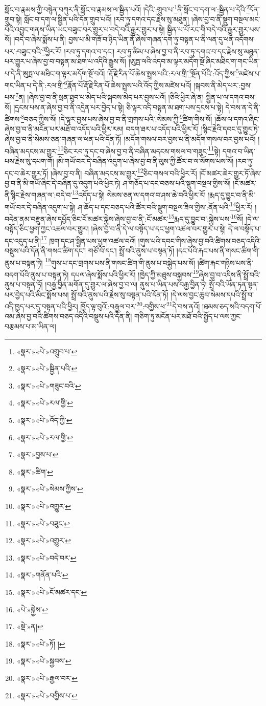 སློང་བ་རྣམས་ཀྱི་བསྙེན་བཀུར་ནི་སློང་བ་རྣམས་ལ་སྦྱིན་པའོ། །དེའི་:གྲུབ་པ་\footnote{«སྣར་»«པེ་»འགྲུབ་པ་}ནི་སློང་བ་དག་ལ་:སྦྱིན་པ་དེའི་\footnote{«སྣར་»«པེ་»སྦྱིན་པའི་}དོན་གྲུབ་སྟེ། སློང་བ་དག་ལ་སྦྱིན་པའི་དོན་གྲུབ་པའོ། །རབ་ཏུ་དགའ་དང་རྗེས་སུ་མཐུན། །ཞེས་བྱ་བ་ནི་སྡུག་བསྔལ་མང་པོའི་འབྱུང་གནས་ཡིན་ཡང་བཟུང་བར་གྱུར་པ་བདེ་བའི་རྒྱུར་གྱུར་པ་སྟེ། སྦྱིན་པ་པོ་རང་གི་བདེ་བའི་རྒྱུར་གྱུར་པས་སོ། །བདེ་བ་ཞེས་སྨོས་པ་ནི། བྱས་པ་མི་གཟོ་བ་ཉིད་ཡིན་ནོ་ཞེས་གཞན་དག་ཏུ་བསྟན་པ་ནི་ལན་དུ་ཕན་འདོགས་པར་:བཟུང་བའི་\footnote{«སྣར་»«པེ་»གཟུང་བའི་}ཕྱིར་རོ། །རབ་ཏུ་དགའ་བ་དང་། རབ་ཏུ་ཚིམ་པ་ཞེས་བྱ་བ་ནི་རབ་ཏུ་དགའ་བ་དང་རྗེས་སུ་མཐུན་པར་གྱུར་པ་ཞེས་བྱ་བ་བསྟན་མ་ཐག་པ་འདིའི་རྒྱུས་སོ། །ཨུཏྤ་ལའི་འདབ་མ་ལྟར་མདོག་སྔོ་ཞིང་མཐིང་ག་གང་ཡིན་པ་དེ་ནི་ཨུཏྤ་ལ་མཐིང་ག་ལྟར་མདོག་སྔོ་བའོ། །རྡོ་རྗེ་རིན་པོ་ཆེས་སྤྲས་པའི་:རལ་གྲི་\footnote{«སྣར་»«པེ་»རལ་གྱི་}སྔོན་པོའི་:འོད་ཀྱིས་\footnote{«སྣར་»«པེ་»འོད་ཀྱི་}མཛེས་པ་གང་ཡིན་པ་དེ་ནི་:རལ་གྲི་\footnote{«སྣར་»«པེ་»རལ་གྱི་}རྣོན་པོ་རྡོ་རྗེ་རིན་པོ་ཆེས་སྤྲས་པའི་འོད་ཀྱིས་མཛེས་པའོ། །སྐབས་ནི་མེད་པར་:བྱས་པས་\footnote{«སྣར་»བྱས་པ་}ན། །ཞེས་བྱ་བ་ནི་སྲན་ཐུབ་པ་མེད་པའི་སྐབས་མེད་པར་བྱས་པའོ། །ཅིའི་ཕྱིར་ཞེ་ན། སྦྱིན་པ་ལ་དགའ་བས་སོ། །དྲངས་པས་ན་ཞེས་བྱ་བ་ནི་འདྲེན་པར་བྱེད་པ་སྟེ། ཅི་ལྟར་འདི་བསྟན་མ་ཐག་པས་དྲངས་པ་སྟེ། དེ་བས་ན་དེ་ནི་ཚིགས་\footnote{«སྣར་»ཚིག་}བཅད་ཀྱིས་སོ། །དེ་ལྟར་བྱས་པས་ཞེས་བྱ་བ་ནི་གྲགས་པའི་:སེམས་ཀྱི་\footnote{«སྣར་»«པེ་»སེམས་ཀྱིས་}ཚིག་གིས་སོ། །ཆོས་ལ་དགའ་ཞིང་ཞེས་བྱ་བ་ནི་མངོན་པར་མཐོ་བ་འདོད་པའི་ཕྱིར་རམ། བདག་ཐར་པ་འདོད་པའི་ཕྱིར་རོ། །སྙིང་རྗེའི་དབང་དུ་གྱུར་ཏེ་ཞེས་བྱ་བ་ནི་སེམས་ཅན་གཞན་ལ་ཕན་པའི་དོན་ཏོ། །མདོག་གསལ་བར་བྱས་པ་ནི་མདོག་གསལ་བར་བྱས་པའོ། །བཞིན་མདངས་མ་གྱུར་\footnote{«སྣར་»«པེ་»འགྱུར་}ཅིང་རབ་ཏུ་དང་བ་ཞེས་བྱ་བ་ནི་བཞིན་མདངས་གསལ་བ་གཟུང་\footnote{«སྣར་»«པེ་»བཟུང་}སྟེ། དགའ་བ་ཡིན་པས་རྗེས་སུ་དཔག་གོ། །མི་གཡོ་བར་དེ་བཞིན་འདུག་པ་ཞེས་བྱ་བ་ནི་ལུས་ཀྱི་ཚོར་བ་ལ་སོགས་པས་སོ། །རབ་ཏུ་དང་བ་ཆེར་གྱུར་ཏོ། །ཞེས་བྱ་བ་ནི། བཞིན་མདངས་མ་གྱུར་\footnote{«སྣར་»«པེ་»འགྱུར་}ཅིང་གསལ་བའི་ཕྱིར་རོ། །ངོ་མཚར་ཆེར་གྱུར་ཏོ་ཞེས་བྱ་བ་ནི་མི་གཡོ་ཞིང་དེ་བཞིན་དུ་འདུག་པའི་ཕྱིར་ཏེ། ཤ་གཅོད་པ་དང་བཅས་པའི་སྡུག་བསྔལ་གྱིས་སོ། །ངོ་མཚར་ནི་སྙིང་རྗེས་གཞན་ལ་:བདེ་བ་\footnote{«སྣར་»«པེ་»བདེ་བར་}འདོད་པ་སྟེ། སེམས་ཅན་ལ་དགའ་བ་ཤས་ཆེ་བའི་ཕྱིར་རོ། །རྨད་དུ་བྱུང་བ་ནི་མི་གཡོ་བར་དེ་བཞིན་འདུག་པ་སྟེ། ཤ་ཆོད་པ་དང་བཅད་པའི་ཚོར་བའི་སྡུག་བསྔལ་ཟིལ་གྱིས་:ནོན་པའི་\footnote{«སྣར་»གནོན་པའི་}ཕྱིར་རོ། །བདེན་ནམ་བརྫུན་ཞེས་དཔྱོད་ཅིང་ངོ་མཚར་སྐྱེས་ཞེས་བྱ་བ་ནི་:ངོ་མཚར་\footnote{«སྣར་»«པེ་»ངོ་མཚར་དང་}རྨད་དུ་བྱུང་བ་:སྐྱེས་པས་\footnote{«པེ་»སྐྱེས་}སོ། །དེ་ལ་བསྟོད་ཅིང་ཕྱག་ཀྱང་འཚལ་བར་གྱུར། །ཞེས་བྱ་བ་ནི་དེ་ལ་བསྟོད་པ་དང་ཕྱག་འཚལ་བར་གྱུར་པ་སྟེ། དེ་ལ་བསྟོད་པ་དང་འདུད་པ་ནི།\footnote{«སྡེ་»ན།} ཁྲག་དང་ཤ་སྦྱིན་པས་ཕྱག་འཚལ་བའོ། །གུས་པའི་དབང་གིས་ཞེས་བྱ་བའི་ཚིགས་བཅད་འདིའི་བསྡུས་པའི་དོན་ནི་གསང་ཚིག་དང་། གཙོ་བོ་དང་། སྤྲོ་བའི་ནུས་པ་བསྟན་ཏོ། །དང་པོའི་རྐང་པས་ནི་གསང་ཚིག་གི་ནུས་པ་བསྟན་ཏེ། \footnote{«སྣར་»«པེ་»ཏོ། ། }གུས་པ་དང་གྲགས་པས་ནི་གསང་ཚིག་གི་ནུས་པ་བསྐྱེད་པས་སོ། །ཚིག་རྐང་གཉིས་པས་ནི་བདག་པོའི་ནུས་པ་བསྟན་ཏེ། དཔལ་ཞེས་སྨོས་པའི་ཕྱིར་རོ། །ཁྱེད་ཀྱི་མཐུས་བསྐྱབས་\footnote{«སྣར་»«པེ་»སྐྱབས་}ཞེས་བྱ་བ་འདིས་ནི་སྤྲོ་བའི་ནུས་པ་བསྟན་ཏོ། །བརྒྱ་བྱིན་མགོན་དུ་གྱུར་ལ་ཞེས་བྱ་བ་ལ། ནུས་པ་ཡིན་པས་བརྒྱ་བྱིན་ཏེ། སྤྲོ་བའི་ཡོན་ཏན་སྟན་པར་བྱེད་པའི་མིང་སྨོས་པས། སྤྲོ་བའི་ནུས་པའི་རྗེས་སུ་བསྟན་པའི་དོན་ཏོ། །དེ་ལས་བྱང་ཆུབ་སེམས་དཔའི་སྤྲོ་བ་འདི་ཁྱད་པར་དུ་བསྟན་པའི་ཕྱིར། ཁྱོད་ལྟ་བུའོ་:བརྒྱལ་བར་\footnote{«སྣར་»«པེ་»རྒྱལ་བར་}:བགྱིས་ཕ་\footnote{«སྣར་»«པེ་»བགྱིས་པ་}དེ་བས་ནའོ། །ཐམས་ཅད་སའི་བདག་པོ་འམ་ཞེས་བྱ་བའི་ཚིགས་བཅད་འདིའི་བསྡུས་པའི་དོན་ནི། གཅིག་ཏུ་མངོན་པར་མཐོ་བའི་སྤྱོད་པ་ལས་ཀྱང་བརྩམས་པ་མ་ཡིན་ལ། 